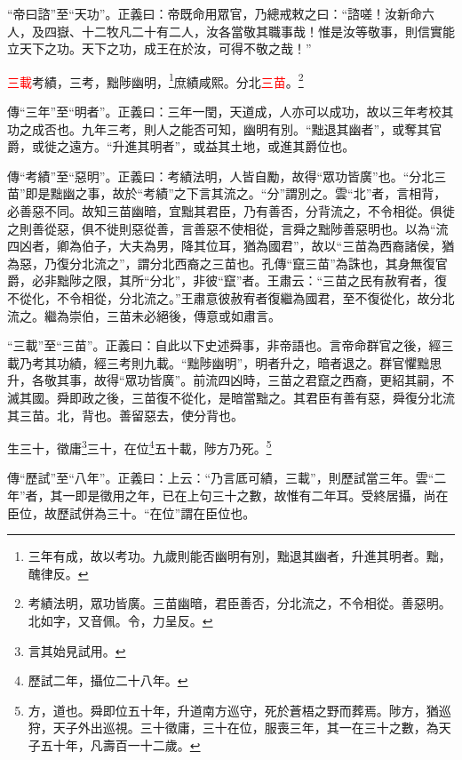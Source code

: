 {\noindent\shu{}\fzkt “帝曰諮”至“天功”。正義曰：帝既命用眾官，乃總戒敕之曰：“諮嗟！汝新命六人，及四嶽、十二牧凡二十有二人，汝各當敬其職事哉！惟是汝等敬事，則信實能立天下之功。天下之功，成王在於汝，可得不敬之哉！” \par}

\textcolor{red}{三載}考績，三考，黜陟幽明，\footnote{三年有成，故以考功。九歲則能否幽明有別，黜退其幽者，升進其明者。黜，醜律反。}庶績咸熙。分北\textcolor{red}{三苗}。\footnote{考績法明，眾功皆廣。三苗幽暗，君臣善否，分北流之，不令相從。善惡明。北如字，又音佩。令，力呈反。}

{\noindent\zhuan{}\fzbyks 傳“三年”至“明者”。正義曰：三年一閏，天道成，人亦可以成功，故以三年考校其功之成否也。九年三考，則人之能否可知，幽明有別。“黜退其幽者”，或奪其官爵，或徙之遠方。“升進其明者”，或益其土地，或進其爵位也。 \par}

{\noindent\zhuan{}\fzbyks 傳“考績”至“惡明”。正義曰：考績法明，人皆自勵，故得“眾功皆廣”也。“分北三苗”即是黜幽之事，故於“考績”之下言其流之。“分”謂別之。雲“北”者，言相背，必善惡不同。故知三苗幽暗，宜黜其君臣，乃有善否，分背流之，不令相從。俱徙之則善從惡，俱不徙則惡從善，言善惡不使相從，言舜之黜陟善惡明也。以為“流四凶者，卿為伯子，大夫為男，降其位耳，猶為國君”，故以“三苗為西裔諸侯，猶為惡，乃復分北流之”，謂分北西裔之三苗也。孔傳“竄三苗”為誅也，其身無復官爵，必非黜陟之限，其所“分北”，非彼“竄”者。王肅云：“三苗之民有赦宥者，復不從化，不令相從，分北流之。”王肅意彼赦宥者復繼為國君，至不復從化，故分北流之。繼為崇伯，三苗未必絕後，傳意或如肅言。 \par}

{\noindent\shu{}\fzkt “三載”至“三苗”。正義曰：自此以下史述舜事，非帝語也。言帝命群官之後，經三載乃考其功績，經三考則九載。“黜陟幽明”，明者升之，暗者退之。群官懼黜思升，各敬其事，故得“眾功皆廣”。前流四凶時，三苗之君竄之西裔，更紹其嗣，不滅其國。舜即政之後，三苗復不從化，是暗當黜之。其君臣有善有惡，舜復分北流其三苗。北，背也。善留惡去，使分背也。 \par}

生三十，徵庸\footnote{言其始見試用。}三十，在位\footnote{歷試二年，攝位二十八年。}五十載，陟方乃死。\footnote{方，道也。舜即位五十年，升道南方巡守，死於蒼梧之野而葬焉。陟方，猶巡狩，天子外出巡視。三十徵庸，三十在位，服喪三年，其一在三十之數，為天子五十年，凡壽百一十二歲。}

{\noindent\zhuan{}\fzbyks 傳“歷試”至“八年”。正義曰：上云：“乃言厎可績，三載”，則歷試當三年。雲“二年”者，其一即是徵用之年，已在上句三十之數，故惟有二年耳。受終居攝，尚在臣位，故歷試併為三十。“在位”謂在臣位也。 \par}

